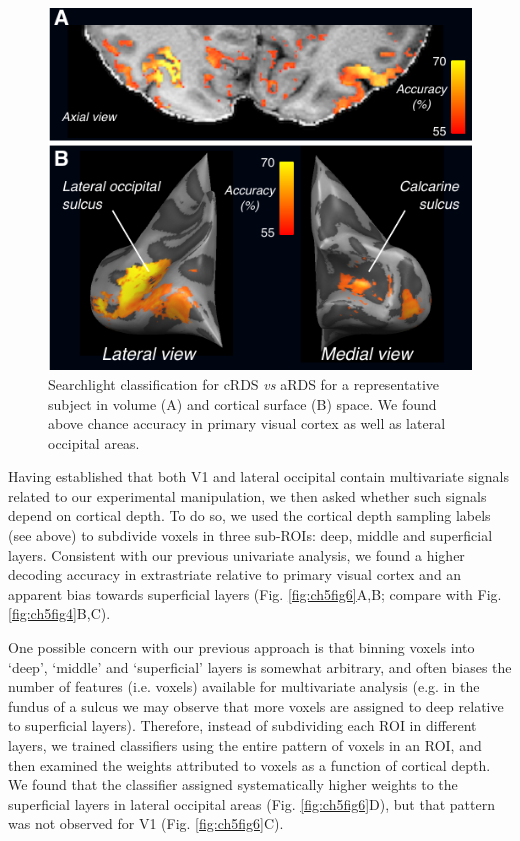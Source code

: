 \begin{figure}
  \centering
  \includegraphics[keepaspectratio]{Fig5.pdf}
  \caption[Searchlight classification for cRDS vs aRDS.]{Searchlight classification for cRDS \textit{vs} aRDS for a representative subject in volume (A) and cortical surface (B) space. We found above chance accuracy in primary visual cortex as well as lateral occipital areas.}
  \label{fig:ch5fig5}
\end{figure}

Having established that both V1 and lateral occipital contain multivariate signals related to our experimental manipulation, we then asked whether such signals depend on cortical depth. To do so, we used the cortical depth sampling labels (see above) to subdivide voxels in three sub-ROIs: deep, middle and superficial layers. Consistent with our previous univariate analysis, we found a higher decoding accuracy in extrastriate relative to primary visual cortex and an apparent bias towards superficial layers (Fig. \ref{fig:ch5fig6}A,B; compare with Fig. \ref{fig:ch5fig4}B,C).

One possible concern with our previous approach is that binning voxels into `deep', `middle' and `superficial' layers is somewhat arbitrary, and often biases the number of features (i.e. voxels) available for multivariate analysis (e.g. in the fundus of a sulcus we may observe that more voxels are assigned to deep relative to superficial layers). Therefore, instead of subdividing each ROI in different layers, we trained classifiers using the entire pattern of voxels in an ROI, and then examined the weights attributed to voxels as a function of cortical depth. We found that the classifier assigned systematically higher weights to the superficial layers in lateral occipital areas (Fig. \ref{fig:ch5fig6}D), but that pattern was not observed for V1 (Fig. \ref{fig:ch5fig6}C).


